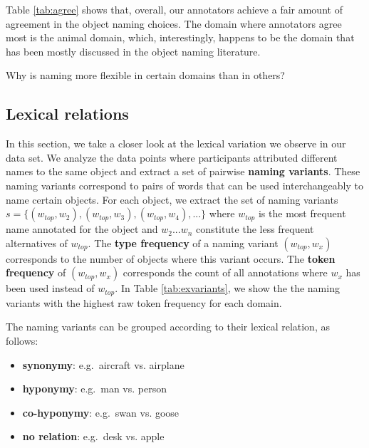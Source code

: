 Table \ref{tab:agree} shows that, overall, our annotators achieve a fair amount of agreement in the object naming choices. The domain where annotators agree most is the animal domain, which, interestingly, happens to be the domain that has been mostly discussed in the object naming literature. 

Why is naming more flexible in certain domains than in others? 

\subsection{Lexical relations}

In this section, we take a closer look at the lexical variation we observe in our data set. We analyze the data points where participants attributed different names to the same object and extract a set of  pairwise \textbf{naming variants}. These naming variants correspond to pairs of words that can be used interchangeably to name certain objects.
For each object, we extract the set of naming variants $s = \{ (w_{top},w_2), (w_{top},w_3), (w_{top},w_4),... \}$  where $w_{top}$ is the most frequent name annotated for the object and $w_2 ... w_n$ constitute the less frequent alternatives of $w_{top}$.  The  \textbf{type frequency} of a naming variant $(w_{top},w_x)$ corresponds to the number of objects where this variant occurs. The \textbf{token frequency} of $(w_{top},w_x)$ corresponds the count of all annotations where $w_x$ has been used instead of $w_{top}$.
In Table \ref{tab:exvariants}, we show the the naming variants with the highest raw token frequency for each domain. 

The naming variants can be grouped according to their lexical relation, as follows:

\begin{itemize}
\item \textbf{synonymy}: e.g.\ aircraft vs. airplane 
\item \textbf{hyponymy}: e.g.\ man vs. person
\item \textbf{co-hyponymy}: e.g.\ swan vs. goose
\item \textbf{no relation}: e.g.\  desk vs. apple
\end{itemize}


